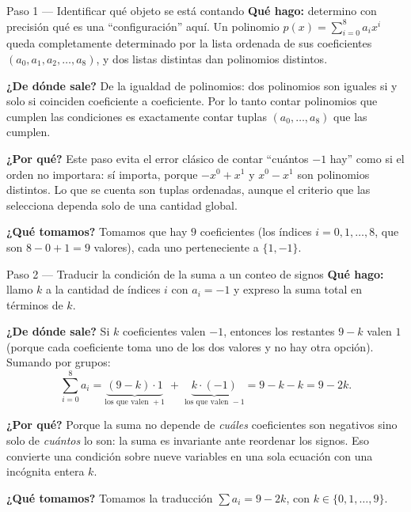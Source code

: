 \documentclass[11pt]{article}
\begin{document}
\begin{paso}{Paso 1 --- Identificar qué objeto se está contando}
\textbf{Qué hago:} determino con precisión qué es una ``configuración'' aquí. Un polinomio
$p(x)=\sum_{i=0}^{8}a_i x^i$ queda completamente determinado por la lista ordenada de sus
coeficientes $(a_0,a_1,a_2,\dots ,a_8)$, y dos listas distintas dan polinomios distintos.

\textbf{¿De dónde sale?} De la igualdad de polinomios: dos polinomios son iguales si y solo si
coinciden coeficiente a coeficiente. Por lo tanto contar polinomios que cumplen las condiciones es
exactamente contar tuplas $(a_0,\dots ,a_8)$ que las cumplen.

\textbf{¿Por qué?} Este paso evita el error clásico de contar ``cuántos $-1$ hay'' como si el orden no
importara: sí importa, porque $-x^0+x^1$ y $x^0-x^1$ son polinomios distintos. Lo que se cuenta son
tuplas ordenadas, aunque el criterio que las selecciona dependa solo de una cantidad global.

\textbf{¿Qué tomamos?} Tomamos que hay $9$ coeficientes (los índices $i=0,1,\dots ,8$, que son
$8-0+1=9$ valores), cada uno perteneciente a $\{1,-1\}$.
\end{paso}

\begin{paso}{Paso 2 --- Traducir la condición de la suma a un conteo de signos}
\textbf{Qué hago:} llamo $k$ a la cantidad de índices $i$ con $a_i=-1$ y expreso la suma total en
términos de $k$.

\textbf{¿De dónde sale?} Si $k$ coeficientes valen $-1$, entonces los restantes $9-k$ valen $1$
(porque cada coeficiente toma uno de los dos valores y no hay otra opción). Sumando por grupos:
\[
\sum_{i=0}^{8} a_i = \underbrace{(9-k)\cdot 1}_{\text{los que valen }+1}\;+\;\underbrace{k\cdot(-1)}_{\text{los que valen }-1}
= 9-k-k = 9-2k.
\]

\textbf{¿Por qué?} Porque la suma no depende de \emph{cuáles} coeficientes son negativos sino solo de
\emph{cuántos} lo son: la suma es invariante ante reordenar los signos. Eso convierte una condición
sobre nueve variables en una sola ecuación con una incógnita entera $k$.

\textbf{¿Qué tomamos?} Tomamos la traducción $\sum a_i = 9-2k$, con $k\in\{0,1,\dots ,9\}$.
\end{paso}
\end{document}
